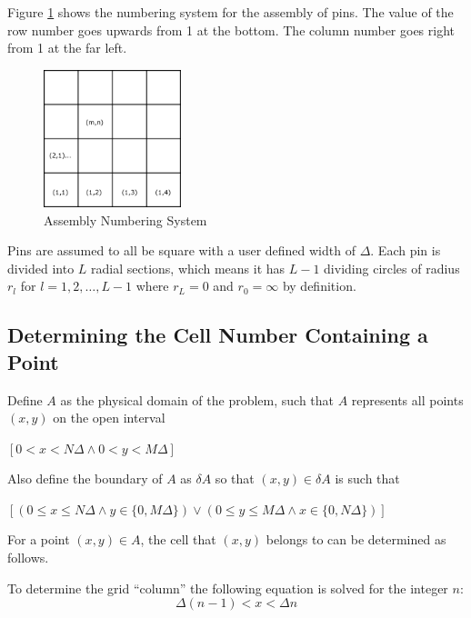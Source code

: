 \documentclass{article}
\begin{document}
Figure \ref{fig:pingrid} shows the numbering system for the assembly of pins. 
The value of the row number goes upwards from 1 at the bottom. 
The column number goes right from 1 at the far left.

\begin{figure}[H]
\begin{center}
\includegraphics[width=40mm]{pingrid.png}
\end{center}
\caption{Assembly Numbering System}
\label{fig:pingrid}
\end{figure}

Pins are assumed to all be square with a user defined width of $\Delta$. 
Each pin is divided into $L$ radial sections, which means it has $L-1$ dividing circles of radius $r_l$ for $l=1,2,\dots,L-1$ where $r_L=0$ and $r_0=\infty$ by definition.

\subsection{Determining the Cell Number Containing a Point}

Define $A$ as the physical domain of the problem, such that $A$ represents all points $(x,y)$ on the open interval
\begin{center}
$[0< x< N\Delta \land 0< y< M\Delta]$
\end{center}
Also define the boundary of $A$ as $\delta A$ so that $(x,y)\in \delta A$ is such that
\begin{center}
$[(0\leq x\leq N\Delta \land y\in \{0,M \Delta\}) \lor (0\leq y\leq M\Delta \land x\in \{0,N \Delta\})]$
\end{center}

For a point $(x,y)\in A$, the cell that $(x,y)$ belongs to can be determined as follows.

To determine the grid ``column'' the following equation is solved for the integer $n$:
\begin{equation}
\Delta (n-1)<x<\Delta n
\label{eq:nsolution}
\end{equation}
\end{document}
